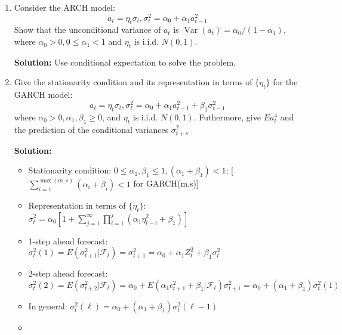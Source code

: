 \documentclass{article}
\begin{document}
\begin{enumerate}
	\item Consider the ARCH model:\\
	\begin{equation*}
	a_{t}=\eta_{t} \sigma_{t}, \sigma_{t}^{2}=\alpha_{0}+\alpha_{1} a_{t-1}^{2}
	\end{equation*}
	Show that the unconditional variance of $a_t$ is $\operatorname{Var}\left(a_{t}\right)=\alpha_{0} /\left(1-\alpha_{1}\right)$,\\ where $\alpha_{0}>0,0 \leq \alpha_{1}<1$ and $\eta_t$ is i.i.d. $N(0, 1)$.
	
	\textbf{Solution:} Use conditional expectation to solve the problem.
	
	\item Give the stationarity condition and its representation in terms of $\{\eta_t\}$ for the GARCH model:
	\begin{equation*}
	a_{t}=\eta_{t} \sigma_{t}, \sigma_{t}^{2}=\alpha_{0}+\alpha_{1} a_{t-1}^{2}+\beta_{1} \sigma_{t-1}^{2}
	\end{equation*}
	where $\alpha_{0}>0, \alpha_{1}, \beta_{1} \geq 0$, and $\eta_t$ is i.i.d. $N(0, 1)$. Futhermore, give $Ea_t^4$ and the prediction of the conditional variances $\sigma_{t+s}^2$
	
	\textbf{Solution:}
	\begin{itemize}
		\item Stationarity condition: $0 \leq \alpha_{1}, \beta_{1} \leq 1,\left(\alpha_{1}+\beta_{1}\right)<1$; [$\sum_{i=1}^{\max (m, s)}\left(\alpha_{i}+\beta_{i}\right)<1$ for GARCH(m,s)]
		\item Representation in terms of $\{\eta_t\}$: $\sigma_{t}^{2}=\alpha_{0}\left[1+\sum_{j=1}^{\infty} \prod_{i=1}^{j}\left(\alpha_{1} \eta_{t-i}^{2}+\beta_{1}\right)\right]$
		\item 1-step ahead forecast: $\sigma_{t}^{2}(1)=E\left(\sigma_{t+1}^{2} | \mathcal{F}_{t}\right)=\sigma_{t+1}^{2}=\alpha_{0}+\alpha_{1} Z_{t}^{2}+\beta_{1} \sigma_{t}^{2}$
		\item 2-step ahead forecast: $\sigma_{t}^{2}(2)=E\left(\sigma_{t+2}^{2} | \mathcal{F}_{t}\right)=\alpha_{0}+E\left(\alpha_{1} \epsilon_{t+1}^{2}+\beta_{1} | \mathcal{F}_{t}\right) \sigma_{t+1}^{2}=\alpha_{0}+\left(\alpha_{1}+\beta_{1}\right) \sigma_{t}^{2}(1)$
		\item In general: $\sigma_{t}^{2}(\ell)=\alpha_{0}+\left(\alpha_{1}+\beta_{1}\right) \sigma_{t}^{2}(\ell-1)$
		\item 
	\end{itemize}


\end{enumerate}
\end{document}
